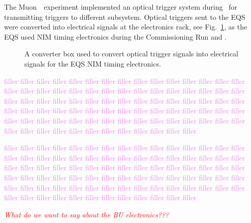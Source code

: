 The Muon~\gmtwo~experiment implemented an optical trigger system during \runone~for transmitting triggers to different subsystem. Optical triggers sent to the EQS were converted into electrical signals at the electronics rack, see Fig.~\ref{fig:opt_trig}, as the EQS used NIM timing electronics during the Commissioning Run and \runone.
\begin{figure}[]
	\centering
	\caption{A converter box used to convert optical trigger signals into electrical signals for the EQS NIM timing electronics.}\label{fig:opt_trig}
\end{figure}

\textcolor{violet}{filler filler filler filler filler filler filler filler filler filler filler filler filler filler filler filler filler filler filler filler filler filler filler filler filler filler filler filler filler filler filler filler filler filler filler filler filler filler filler filler filler filler filler filler filler filler filler filler filler filler filler filler filler filler filler filler filler filler filler filler filler filler filler filler filler filler filler filler filler filler filler filler filler filler filler filler filler filler filler filler filler filler filler filler filler filler filler}

\textcolor{violet}{filler filler filler filler filler filler filler filler filler filler filler filler filler filler filler filler filler filler filler filler filler filler filler filler filler filler filler filler filler filler filler filler filler filler filler filler filler filler filler filler filler filler filler filler filler filler filler filler filler filler filler filler filler filler filler filler filler filler filler filler filler filler filler filler filler filler filler filler filler filler filler filler filler filler filler filler filler filler filler filler filler filler filler filler filler filler filler}

\medskip
\textcolor{red}{\textit{What do we want to say about the BU electronics???}}
\medskip

